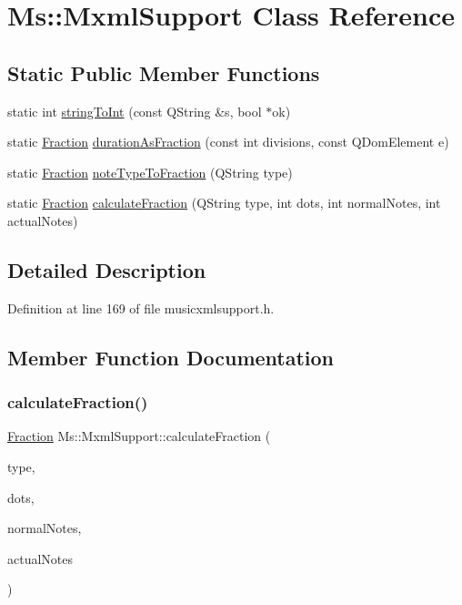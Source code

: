 \hypertarget{class_ms_1_1_mxml_support}{}\section{Ms\+:\+:Mxml\+Support Class Reference}
\label{class_ms_1_1_mxml_support}
\subsection*{Static Public Member Functions}
\begin{DoxyCompactItemize}
\item 
static int \hyperlink{class_ms_1_1_mxml_support_a27aefb8f8b07d4f332931cd2e72f0b9d}{string\+To\+Int} (const Q\+String \&s, bool $\ast$ok)
\item 
static \hyperlink{class_ms_1_1_fraction}{Fraction} \hyperlink{class_ms_1_1_mxml_support_ac718646c8a30332db7b71603e846917b}{duration\+As\+Fraction} (const int divisions, const Q\+Dom\+Element e)
\item 
static \hyperlink{class_ms_1_1_fraction}{Fraction} \hyperlink{class_ms_1_1_mxml_support_ab9182c04357874bc351f1e8c30c1a942}{note\+Type\+To\+Fraction} (Q\+String type)
\item 
static \hyperlink{class_ms_1_1_fraction}{Fraction} \hyperlink{class_ms_1_1_mxml_support_a33406f111b2dd2c99a25782ef2e607d9}{calculate\+Fraction} (Q\+String type, int dots, int normal\+Notes, int actual\+Notes)
\end{DoxyCompactItemize}


\subsection{Detailed Description}


Definition at line 169 of file musicxmlsupport.\+h.



\subsection{Member Function Documentation}
\mbox{\label{class_ms_1_1_mxml_support_a33406f111b2dd2c99a25782ef2e607d9}} 
\subsubsection{\texorpdfstring{calculate\+Fraction()}{calculateFraction()}}
{\footnotesize\ttfamily \hyperlink{class_ms_1_1_fraction}{Fraction} Ms\+::\+Mxml\+Support\+::calculate\+Fraction (\begin{DoxyParamCaption}\item[{Q\+String}]{type,  }\item[{int}]{dots,  }\item[{int}]{normal\+Notes,  }\item[{int}]{actual\+Notes }\end{DoxyParamCaption})\hspace{0.3cm}{\ttfamily [static]}}

